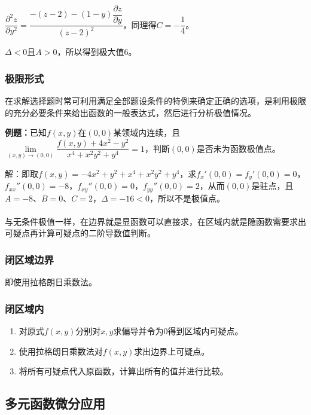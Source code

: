 $\dfrac{\partial^2z}{\partial y^2}=\dfrac{-(z-2)-(1-y)\dfrac{\partial z}{\partial y}}{(z-2)^2}$，同理得$C=-\dfrac{1}{4}$。

$\Delta<0$且$A>0$，所以得到极大值6。

\subsubsection{极限形式}

在求解选择题时常可利用满足全部题设条件的特例来确定正确的选项，是利用极限的充分必要条件来给出函数的一般表达式，然后进行分析极值情况。

\textbf{例题：}已知$f(x,y)$在$(0,0)$某领域内连续，且$\lim\limits_{(x,y)\to(0,0)}\dfrac{f(x,y)+4x^2-y^2}{x^4+x^2y^2+y^4}=1$，判断$(0,0)$是否未为函数极值点。

解：即取$f(x,y)=-4x^2+y^2+x^4+x^2y^2+y^4$，求$f_x'(0,0)=f_y'(0,0)=0$，$f_{xx}''(0,0)=-8$，$f_{xy}''(0,0)=0$，$f_{yy}''(0,0)=2$，从而$(0,0)$是驻点，且$A=-8$、$B=0$、$C=2$，$\Delta=-16<0$，所以不是极值点。

\paragraph{}

与无条件极值一样，在边界就是显函数可以直接求，在区域内就是隐函数需要求出可疑点再计算可疑点的二阶导数值判断。

\subsubsection{闭区域边界}

即使用拉格朗日乘数法。

\subsubsection{闭区域内}

\begin{enumerate}
    \item 对原式$f(x,y)$分别对$x,y$求偏导并令为0得到区域内可疑点。
    \item 使用拉格朗日乘数法对$f(x,y)$求出边界上可疑点。
    \item 将所有可疑点代入原函数，计算出所有的值并进行比较。
\end{enumerate}

\subsection{多元函数微分应用}

